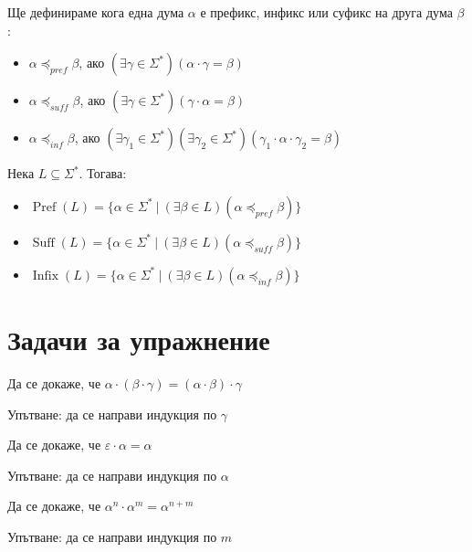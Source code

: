 \begin{definition}
    Ще дефинираме кога една дума $\alpha$ е префикс, инфикс или суфикс на друга дума $\beta$:
    \begin{itemize}
        \item $\alpha \preceq_{pref} \beta$, ако $(\exists \gamma \in \Sigma^*)(\alpha \cdot \gamma = \beta)$
        \item $\alpha \preceq_{suff} \beta$, ако $(\exists \gamma \in \Sigma^*)(\gamma \cdot \alpha = \beta)$
        \item $\alpha \preceq_{inf} \beta$, ако $(\exists \gamma_1 \in \Sigma^*)(\exists \gamma_2 \in \Sigma^*)(\gamma_1 \cdot \alpha \cdot \gamma_2 = \beta)$
    \end{itemize}
    Нека $L \subseteq \Sigma^*$. Тогава:
    \begin{itemize}
        \item $\operatorname{Pref}(L) = \{ \alpha \in \Sigma^* \: | \: (\exists \beta \in L)(\alpha \preceq_{pref} \beta) \}$
        \item $\operatorname{Suff}(L) = \{ \alpha \in \Sigma^* \: | \: (\exists \beta \in L)(\alpha \preceq_{suff} \beta) \}$
        \item $\operatorname{Infix}(L) = \{ \alpha \in \Sigma^* \: | \: (\exists \beta \in L)(\alpha \preceq_{inf} \beta) \}$
    \end{itemize}
\end{definition}

\section{Задачи за упражнение}

\begin{problem}[асоциативност]
Да се докаже, че $\alpha \cdot (\beta \cdot \gamma) = (\alpha \cdot \beta) \cdot \gamma$

Упътване: да се направи индукция по $\gamma$
\end{problem}

\begin{problem}\label{epsilon-neutral-element}
Да се докаже, че $\varepsilon \cdot \alpha = \alpha$

Упътване: да се направи индукция по $\alpha$
\end{problem}

\begin{problem}
Да се докаже, че $\alpha^n \cdot \alpha^m = \alpha^{n + m}$

Упътване: да се направи индукция по $m$
\end{problem}



